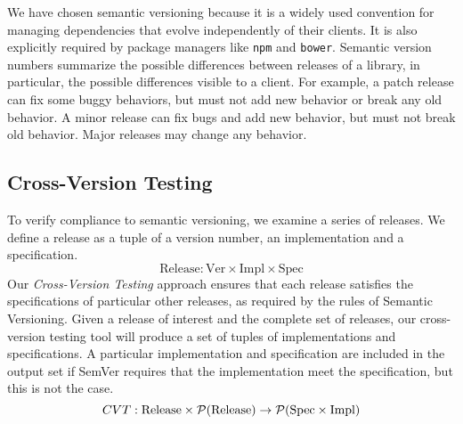 We have chosen semantic versioning because it is a widely used
convention for managing dependencies that evolve independently of
their clients.
%
It is also explicitly required by package managers like
{\tt npm} and {\tt bower}.
%
Semantic version numbers summarize the possible differences between
releases of a library, in particular, the possible differences visible
to a client. For example, a patch release can fix some buggy
behaviors, but must not add new behavior or break any old behavior. A
minor release can fix bugs and add new behavior, but must not break
old behavior. Major releases may change any behavior.

\subsection{Cross-Version Testing} \label{sec:cvt}
To verify compliance to semantic versioning, we examine a series of
releases.
%
We define a release as a tuple of a version number, an implementation
and a specification.
$$ \text{Release} : \text{Ver} \times \text{Impl} \times \text{Spec} $$
%
Our \emph{Cross-Version Testing} approach ensures that each release
satisfies the specifications of particular other releases, as required
by the rules of Semantic Versioning. Given a release of interest and
the complete set of releases, our cross-version testing tool will
produce a set of tuples of implementations and specifications. A
particular implementation and specification are included in the output
set if SemVer requires that the implementation meet the specification,
but this is not the case.
$$
CVT : \text{Release} \times \mathcal{P}(\text{Release}) \to \mathcal{P}(\text{Spec} \times \text{Impl})
$$


